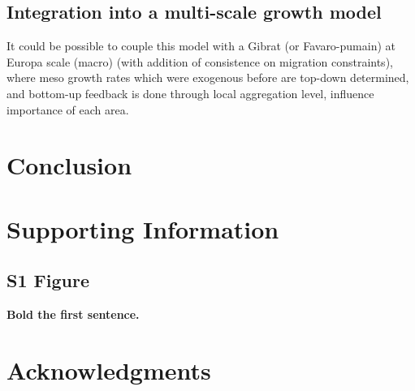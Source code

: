 \documentclass[10pt,letterpaper]{article}
\begin{document}
\subsection*{Integration into a multi-scale growth model}

It could be possible to couple this model with a Gibrat (or Favaro-pumain) at Europa scale (macro) (with addition of consistence on migration constraints), where meso growth rates which were exogenous before are top-down determined, and bottom-up feedback is done through local aggregation level, influence importance of each area.




\section*{Conclusion}




\section*{Supporting Information}

\subsection*{S1 Figure}
\label{S1_Figure}
{\bf Bold the first sentence.}



\section*{Acknowledgments}



\nolinenumbers

%
%
% 




\end{document}
